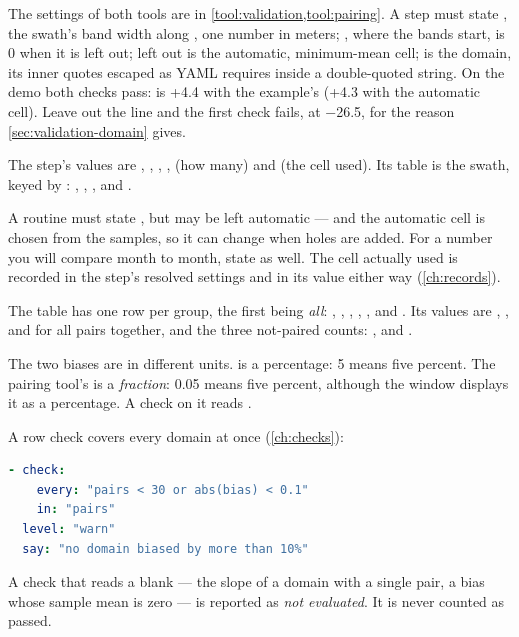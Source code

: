 The settings of both tools are in \cref{tool:validation,tool:pairing}. A  step must state , the swath's band width along , one number in meters; , where the bands start, is 0 when it is left out;  left out is the automatic, minimum-mean cell;  is the domain, its inner quotes escaped as YAML requires inside a double-quoted string. On the demo both checks pass:  is +4.4 with the example's  (+4.3 with the automatic cell). Leave out the  line and the first check fails, at −26.5, for the reason \cref{sec:validation-domain} gives.

The  step's values are , , , ,  (how many) and  (the cell used). Its table is the swath, keyed by : , , ,  and .

\begin{caution}
A routine must state , but  may be left automatic — and the automatic cell is chosen from the samples, so it can change when holes are added. For a number you will compare month to month, state  as well. The cell actually used is recorded in the step's resolved settings and in its  value either way (\cref{ch:records}).
\end{caution}

The  table has one row per group, the first being \emph{all}: , , , , ,  and . Its values are , ,  and  for all pairs together, and the three not-paired counts: ,  and .

The two biases are in different units.  is a percentage: 5 means five percent. The pairing tool's  is a \emph{fraction}: 0.05 means five percent, although the window displays it as a percentage. A check on it reads .

A row check covers every domain at once (\cref{ch:checks}):

\begin{lstlisting}[language=yaml]
- check:
    every: "pairs < 30 or abs(bias) < 0.1"
    in: "pairs"
  level: "warn"
  say: "no domain biased by more than 10%"
\end{lstlisting}

A check that reads a blank — the slope of a domain with a single pair, a bias whose sample mean is zero — is reported as \emph{not evaluated}. It is never counted as passed.
